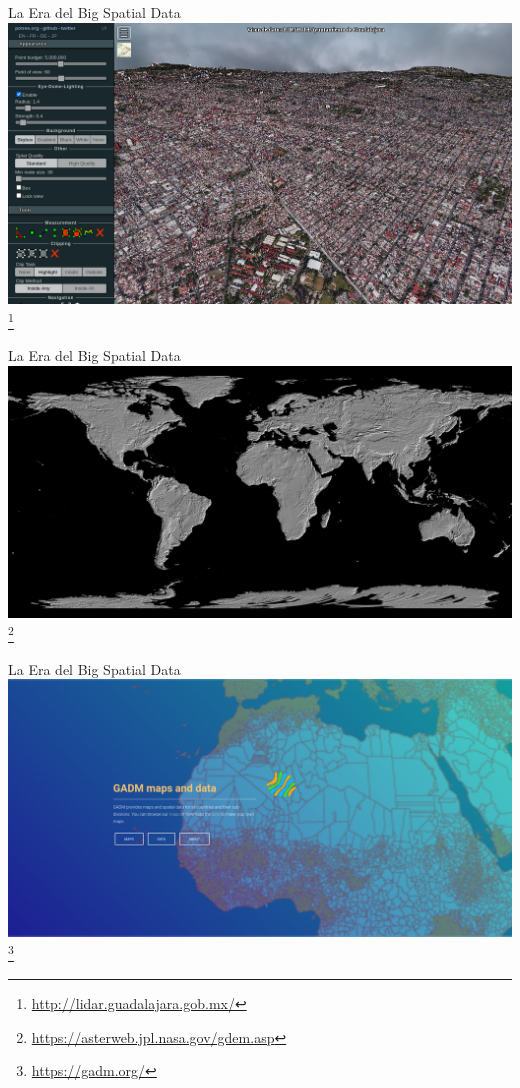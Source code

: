 \documentclass{beamer}
\newcommand\blfootnote[1]{%
  \begingroup
  \renewcommand\thefootnote{}\footnote{#1}%
  \addtocounter{footnote}{-1}%
  \endgroup
}
\begin{document}
\begin{frame}{La Era del Big Spatial Data}
  \centering
  \includegraphics[width=\textwidth]{figures/guadalajara}
  \blfootnote{\url{http://lidar.guadalajara.gob.mx/}}
\end{frame}

\begin{frame}{La Era del Big Spatial Data}
  \centering
  \includegraphics[width=\textwidth]{figures/asterdem}
  \blfootnote{\url{https://asterweb.jpl.nasa.gov/gdem.asp}}
\end{frame}

\begin{frame}{La Era del Big Spatial Data}
  \centering
  \includegraphics[width=\textwidth]{figures/gadm}
  \blfootnote{\url{https://gadm.org/}}
\end{frame}
\end{document}
